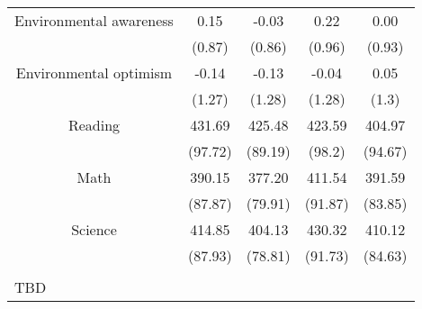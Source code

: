 \begin{table}[!htbp]
\begin{tabular}{@{\extracolsep{5pt}} ccccc}
Environmental awareness &  0.15 & -0.03 &  0.22 &  0.00 \\ 
 & (0.87) & (0.86) & (0.96) & (0.93) \\ 
Environmental optimism & -0.14 & -0.13 & -0.04 &  0.05 \\ 
 & (1.27) & (1.28) & (1.28) & (1.3) \\ 
Reading & 431.69 & 425.48 & 423.59 & 404.97 \\ 
 & (97.72) & (89.19) & (98.2) & (94.67) \\ 
Math & 390.15 & 377.20 & 411.54 & 391.59 \\ 
 & (87.87) & (79.91) & (91.87) & (83.85) \\ 
Science & 414.85 & 404.13 & 430.32 & 410.12 \\ 
 & (87.93) & (78.81) & (91.73) & (84.63) \\ 
\hline \\[-1.8ex] 
\multicolumn{5}{l}{TBD} \\ 
\end{tabular} 
\end{table} 
